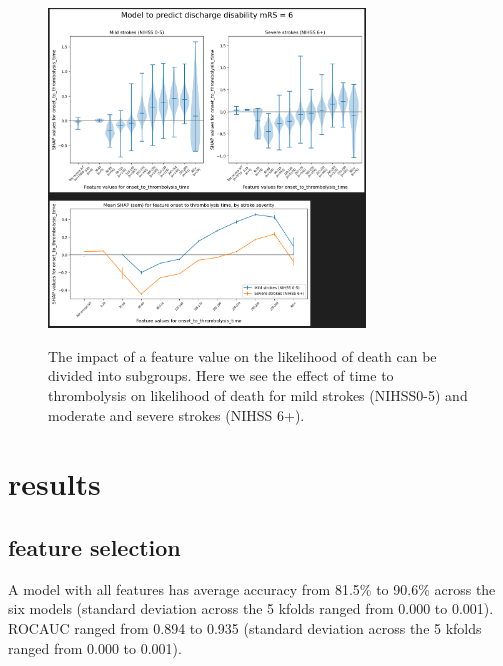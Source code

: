 \begin{figure}[!h]
    \centering    
    \includegraphics[width=0.75\textwidth]
{./images/053_predict_mrs6_split_by_ss.png}\\
    \caption{The impact of a feature value on the likelihood of death can be divided into subgroups. Here we see the effect of time to thrombolysis on likelihood of death for mild strokes (NIHSS0-5) and moderate and severe strokes (NIHSS 6+).}
    \label{fig:mrs6_violin_split}
\end{figure}


\section{results}
\subsection{feature selection}

A model with all features has average accuracy from 81.5\% to 90.6\% across the six models (standard deviation across the 5 kfolds ranged from 0.000 to 0.001). ROCAUC ranged from 0.894 to 0.935 (standard deviation across the 5 kfolds ranged from 0.000 to 0.001). 